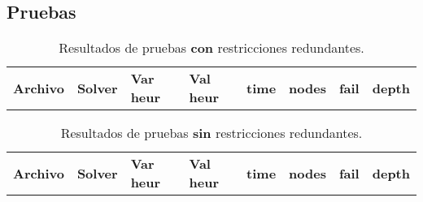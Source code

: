 
\subsection{Pruebas}\label{sec:01-jobshop_tardanza-pruebas}

\begin{compactfloats}
\begin{table}[H]
  \centering
  \small
  \setlength{\tabcolsep}{10.8pt}
  \caption{Resultados de pruebas \textbf{con} restricciones redundantes.}
  \label{tab:pruebas-jobshop_tardanza-on}
  \begin{tabular}{l l l l l r r r}
    \toprule
    \textbf{Archivo} & \textbf{Solver} & \textbf{Var heur} & \textbf{Val heur} & \textbf{time} & \textbf{nodes} & \textbf{fail} & \textbf{depth} \\
  \end{tabular}
\end{table}

\begin{table}[H]
  \centering
  \small
  \setlength{\tabcolsep}{10.8pt}
  \caption{Resultados de pruebas \textbf{sin} restricciones redundantes.}
  \label{tab:pruebas-jobshop_tardanza-off}
  \begin{tabular}{l l l l r r r r}
    \toprule
    \textbf{Archivo} & \textbf{Solver} & \textbf{Var heur} & \textbf{Val heur} & \textbf{time} & \textbf{nodes} & \textbf{fail} & \textbf{depth} \\
  \end{tabular}
\end{table}
\end{compactfloats}

\FloatBarrier
